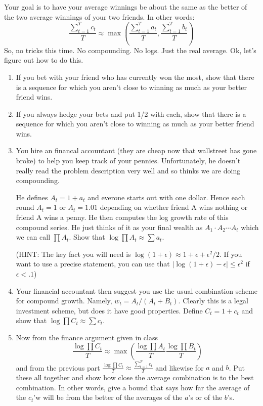 \documentclass[12pt]{extarticle}
\begin{document}
Your goal is to have your average winnings be about the same as the
better of the two average winnings of your two friends.  In other words:
\begin{displaymath}
\frac{\sum_{t=1}^T c_t}{T} \approx \max(\frac{\sum_{t=1}^T a_t}{T},\frac{\sum_{t=1}^T b_t}{T})
\end{displaymath}
So, no tricks this time.  No compounding.  No logs.  Just the real
average.  Ok, let's figure out how to do this.
\begin{enumerate}
\item If you bet with your friend who has currently won the most, show
that there is a sequence for which you aren't close to winning as much
as your better friend wins.
\item If you always hedge your bets and put 1/2 with each, show that
there is a sequence for which you aren't close to winning as much
as your better friend wins.
\item You hire an financal accountant (they are cheap now that
 wallstreet has gone broke) to help you keep track of your pennies.
  Unfortunately, he doesn't really read the problem description very
 well and so thinks we are doing compounding.  

 He defines $A_t = 1 + a_t$ and everone starts out with one dollar.
  Hence each round $A_t = 1$ or $A_t = 1.01$ depending on whether
 friend A wins nothing or friend A wins a penny.  He then computes the
 log growth rate of this compound series.  He just thinks of it as
 your final wealth as $A_1 \cdot A_2 \cdots A_t$ which we can call
 $\prod A_t$.  Show that $\log \prod A_t \approx \sum a_t$.

(HINT: The key fact you will need is $\log(1+\epsilon) \approx 1 +
\epsilon + \epsilon^2/2$.  If you want to use a precise statement, you
can use that $|\log(1+\epsilon) - \epsilon| \le \epsilon^2$ if
$\epsilon < .1$)

\item Your financial accountant then suggest you use the usual
 combination scheme for compound growth.  Namely, $w_t =
 A_t/(A_t+B_t)$.  Clearly this is a legal investment scheme, but does
 it have good properties.  Define $C_t = 1 + c_t$ and show that $\log
 \prod C_t \approx \sum c_t$.
\item Now from the finance argument given in class
\begin{displaymath}
\frac{\log \prod C_t}{T} \approx \max(
\frac{\log \prod A_t}{T}
\frac{\log \prod B_t}{T})
\end{displaymath}
and from the previous part $\frac{\log \prod C_t}{T} \approx
\frac{\sum_{t=1}^T c_t}{T}$ and likewise for $a$ and $b$.  Put these
all together and show how close the average combination is to the best
combination.  In other words, give a bound that says how far the average
of the $c_t$'w will be from the better of the averages of the $a$'s or
of the $b$'s.
\end{enumerate}
\end{document}
